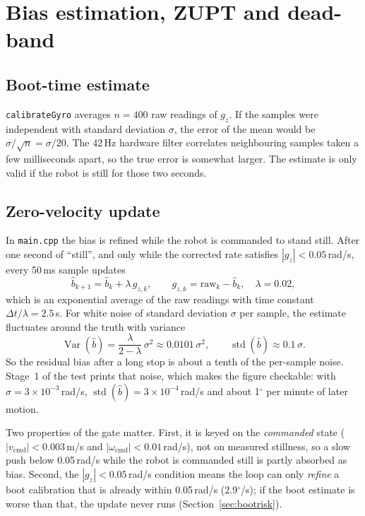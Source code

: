\documentclass[11pt,a4paper]{report}
\newcommand{\code}[1]{\texttt{#1}}
\begin{document}
\section{Bias estimation, ZUPT and dead-band}
\subsection{Boot-time estimate}
\code{calibrateGyro} averages $n=400$ raw readings of $g_z$. If the samples were independent with standard deviation $\sigma$, the error of the mean would be $\sigma/\sqrt{n}=\sigma/20$. The 42\,Hz hardware filter correlates neighbouring samples taken a few milliseconds apart, so the true error is somewhat larger. The estimate is only valid if the robot is still for those two seconds.

\subsection{Zero-velocity update}
In \code{main.cpp} the bias is refined while the robot is commanded to stand still. After one second of ``still'', and only while the corrected rate satisfies $|g_z|<0.05$\,rad/s, every 50\,ms sample updates
\begin{equation}
  \hat b_{k+1}=\hat b_k+\lambda\,g_{z,k},\qquad g_{z,k}=\text{raw}_k-\hat b_k,\quad\lambda=0.02, \label{eq:zupt}
\end{equation}
which is an exponential average of the raw readings with time constant $\Delta t/\lambda=2.5$\,s. For white noise of standard deviation $\sigma$ per sample, the estimate fluctuates around the truth with variance
\begin{equation}
  \operatorname{Var}(\hat b)=\frac{\lambda}{2-\lambda}\,\sigma^2\approx0.0101\,\sigma^2,\qquad \operatorname{std}(\hat b)\approx0.1\,\sigma. \label{eq:zuptvar}
\end{equation}
So the residual bias after a long stop is about a tenth of the per-sample noise. Stage~1 of the test prints that noise, which makes the figure checkable: with $\sigma=3\times10^{-3}$\,rad/s, $\operatorname{std}(\hat b)=3\times10^{-4}$\,rad/s and about 1$^\circ$ per minute of later motion.

Two properties of the gate matter. First, it is keyed on the \emph{commanded} state ($|v_{\mathrm{cmd}}|<0.003$\,m/s and $|\omega_{\mathrm{cmd}}|<0.01$\,rad/s), not on measured stillness, so a slow push below 0.05\,rad/s while the robot is commanded still is partly absorbed as bias. Second, the $|g_z|<0.05$\,rad/s condition means the loop can only \emph{refine} a boot calibration that is already within 0.05\,rad/s (2.9$^\circ$/s); if the boot estimate is worse than that, the update never runs (Section~\ref{sec:bootrisk}).
\end{document}

